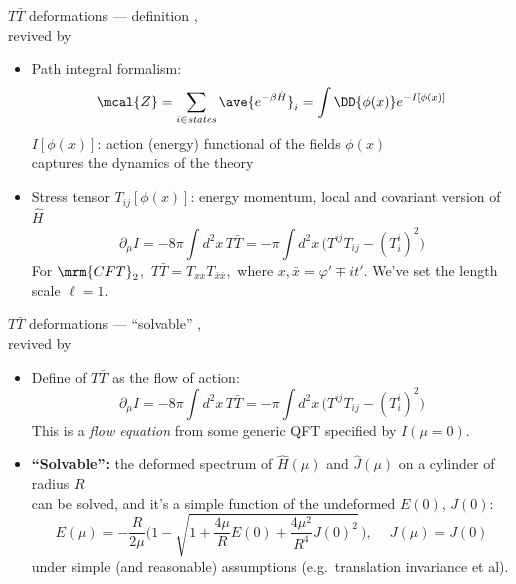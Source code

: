 \documentclass[aspectratio=169,10pt
	,noamsthm
]{beamer}
\newcommand{\TTbar}{\texorpdfstring{\ensuremath{T\bar{T}}}{TTbar}\xspace}
\begin{document}
\begin{frame}{\TTbar deformations --- definition}{%
	\textcite{Zamolodchikov:2004ce},\\
	revived by \textcite{Smirnov:2016lqw,Cavaglia:2016oda}
}
\begin{itemize}
\item Path integral formalism:
\begin{equation}
	\mcal{Z}
	= \sum_{i \in \textit{states}} \ave{e^{-\beta \hat{H}}}_i
	= \int \DD{\phi(x)} e^{-I[\phi(x)]}
\label{eq:partition}
\end{equation}
$I[\phi(x)]$: action (energy) functional of the fields $\phi(x)$\\
\phantom{$I[\phi(x)]$: }captures the dynamics of the theory

\pause

\item Stress tensor $T_{ij}[\phi(x)]$: energy momentum, local and covariant version of $\hat{H}$
\begin{equation}
	\partial_\mu I = -{8 \pi} \int d^2x \, T\bar T =  -{\pi} \int d^2x\,\big( T^{ij}T_{ij}- (T^i_i)^2 \big)
\end{equation}
For $\mrm{CFT}_2$,\ $T\bar{T} = T_{xx} T_{\bar{x}\bar{x}}$,\ where $x, \bar{x} = \varphi' \mp it'$.
{\footnotesize We've set the length scale $\ell = 1$.}

\end{itemize}
\end{frame}

\begin{frame}{\TTbar deformations --- ``solvable''}{%
	\textcite{Zamolodchikov:2004ce},\\
	revived by \textcite{Smirnov:2016lqw,Cavaglia:2016oda}
}
\vspace{-.3\baselineskip}
\begin{itemize}
\item Define of \TTbar as the flow of action:
\begin{equation}
	\label{TTbardefintro}
	\partial_\mu I = -{8 \pi} \int d^2x \, T\bar T =  -{\pi} \int d^2x\,\big( T^{ij}T_{ij}- (T^i_i)^2 \big)
\end{equation}
This is a \textit{flow equation} from some generic QFT specified by $I(\mu = 0)$. 

\pause

\item \textbf{``Solvable'':} the deformed spectrum of $\hat{H}(\mu)$ and $\hat{J}(\mu)$ on a cylinder of radius $R$\\
can be solved, and it's a simple function of the undeformed $E(0)$, $J(0)$:
\begin{equation}
	E(\mu) = - \frac{R }{ 2\mu } \bigg(1-\sqrt{1 + \frac{4\mu}{R} E(0) + \frac{4\mu^2}{R^4} J(0)^2 }
	\,\bigg), \ \quad J(\mu)=J(0) %
\end{equation}
under simple (and reasonable) assumptions (e.g.~translation invariance et al). 

\end{itemize}
\end{frame}
\end{document}
